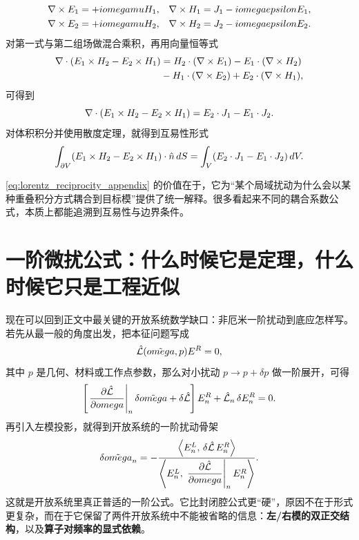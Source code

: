 \begin{align}
\nabla\times E_1 &= +iomegamuH_1,
&
\nabla\times H_1 &= J_1-iomegaepsilonE_1,
\\
\nabla\times E_2 &= +iomegamuH_2,
&
\nabla\times H_2 &= J_2-iomegaepsilonE_2.
\end{align}
对第一式与第二组场做混合乘积，再用向量恒等式
\begin{equation}
\begin{aligned}
\nabla\cdot(E_1\times H_2-E_2\times H_1)
&=
H_2\cdot(\nabla\times E_1)
-
E_1\cdot(\nabla\times H_2)
\\
&
-
H_1\cdot(\nabla\times E_2)
+
E_2\cdot(\nabla\times H_1),
\end{aligned}
\label{eq:vector_identity_appendix}
\end{equation}
可得到
\begin{equation}
\nabla\cdot(E_1\times H_2-E_2\times H_1)
=
E_2\cdot J_1-E_1\cdot J_2.
\end{equation}
对体积积分并使用散度定理，就得到互易性形式
\begin{equation}
\int_{\partial V}(E_1\times H_2-E_2\times H_1)\cdot\hat{n}\,d S
=
\int_V (E_2\cdot J_1-E_1\cdot J_2)\,d V.
\label{eq:lorentz_reciprocity_appendix}
\end{equation}

\cref{eq:lorentz_reciprocity_appendix} 的价值在于，它为“某个局域扰动为什么会以某种重叠积分方式耦合到目标模”提供了统一解释。很多看起来不同的耦合系数公式，本质上都能追溯到互易性与边界条件。

\section{一阶微扰公式：什么时候它是定理，什么时候它只是工程近似}
现在可以回到正文中最关键的开放系统数学缺口：非厄米一阶扰动到底应怎样写。若先从最一般的角度出发，把本征问题写成
\begin{equation}
\hat{\mathcal L}(\tilde{omega},p)E^{R}=0,
\label{eq:nonhermitian_eigenproblem_appendix}
\end{equation}
其中 $p$ 是几何、材料或工作点参数，那么对小扰动 $p\to p+\delta p$ 做一阶展开，可得
\begin{equation}
\left[
\left.\frac{\partial \hat{\mathcal L}}{\partial omega}\right|_n \delta\tilde{omega}
+\delta\hat{\mathcal L}
\right]E_n^{R}
+
\hat{\mathcal L}_n\,\delta E_n^{R}
=0.
\label{eq:nonhermitian_expand_appendix}
\end{equation}
再引入左模投影，就得到开放系统的一阶扰动骨架
\begin{equation}
\delta\tilde{omega}_n
=
-
\frac{
\left\langle E_n^{L},\,\delta\hat{\mathcal L}\,E_n^{R}\right\rangle
}
{
\left\langle E_n^{L},\,\left.\dfrac{\partial\hat{\mathcal L}}{\partial omega}\right|_n E_n^{R}\right\rangle
}.
\label{eq:nonhermitian_first_order_appendix}
\end{equation}
这就是开放系统里真正普适的一阶公式。它比封闭腔公式更“硬”，原因不在于形式更复杂，而在于它保留了两件开放系统中不能被省略的信息：\textbf{左/右模的双正交结构}，以及\textbf{算子对频率的显式依赖}。


